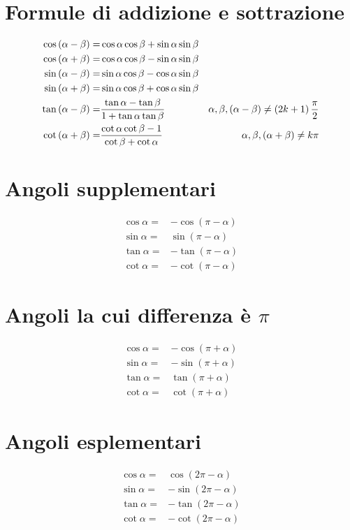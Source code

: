 \section{Formule di addizione e sottrazione}
\begin{align*}
\cos\left(\alpha-\beta\right)=&{}\cos\alpha\cos\beta+\sin\alpha\sin\beta\\\index{Coseno!differenza angoli}
\cos\left(\alpha+\beta\right)=&{}\cos\alpha\cos\beta-\sin\alpha\sin\beta\\\index{Coseno!somma angoli}
\sin\left(\alpha-\beta\right)=&{}\sin\alpha\cos\beta-\cos\alpha\sin\beta\\\index{Seno!differenza angoli}
\sin\left(\alpha+\beta\right)=&{}\sin\alpha\cos\beta+\cos\alpha\sin\beta\\\index{Seno!somma angoli}
\tan\left(\alpha-\beta\right)=&{}\dfrac{\tan\alpha-\tan\beta}{1+\tan\alpha\tan\beta} &\alpha,\beta,\left(\alpha-\beta\right)\neq\left(2k+1\right)\dfrac{\pi}{2}\\\index{Tangente!differenza angoli}
\cot\left(\alpha+\beta\right)=&{}\dfrac{\cot\alpha\cot\beta-1}{\cot\beta+\cot\alpha}
&\alpha,\beta,\left(\alpha+\beta\right)\neq k\pi\index{Cotangente!somma angoli}
\end{align*}
\section{Angoli supplementari}
\begin{align*}
\cos\alpha=&-\cos(\pi-\alpha)\\
\sin\alpha=&\sin(\pi-\alpha)\\
\tan\alpha=&-\tan(\pi-\alpha)\\
\cot\alpha=&-\cot(\pi-\alpha)
\end{align*}
\section{Angoli la cui differenza è \texorpdfstring{$\pi$}{\textpi}}
\begin{align*}
\cos\alpha=&-\cos(\pi+\alpha)\\
\sin\alpha=&-\sin(\pi+\alpha)\\
\tan\alpha=&\tan(\pi+\alpha)\\
\cot\alpha=&\cot(\pi+\alpha)
\end{align*}
\section{Angoli esplementari}
\begin{align*}
\cos\alpha=&\cos(2\pi-\alpha)\\
\sin\alpha=&-\sin(2\pi-\alpha)\\
\tan\alpha=&-\tan(2\pi-\alpha)\\
\cot\alpha=&-\cot(2\pi-\alpha)
\end{align*}
